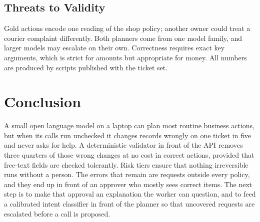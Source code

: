\documentclass{icaiit2027}
\begin{document}
\subsection{Threats to Validity}

Gold actions encode one reading of the shop policy; another owner could treat a courier complaint differently. Both planners come from one model family, and larger models may escalate on their own. Correctness requires exact key arguments, which is strict for amounts but appropriate for money. All numbers are produced by scripts published with the ticket set.

\section{Conclusion}

A small open language model on a laptop can plan most routine business actions, but when its calls run unchecked it changes records wrongly on one ticket in five and never asks for help. A deterministic validator in front of the API removes three quarters of those wrong changes at no cost in correct actions, provided that free-text fields are checked tolerantly. Risk tiers ensure that nothing irreversible runs without a person. The errors that remain are requests outside every policy, and they end up in front of an approver who mostly sees correct items. The next step is to make that approval an explanation the worker can question, and to feed a calibrated intent classifier in front of the planner so that uncovered requests are escalated before a call is proposed.


\end{document}
